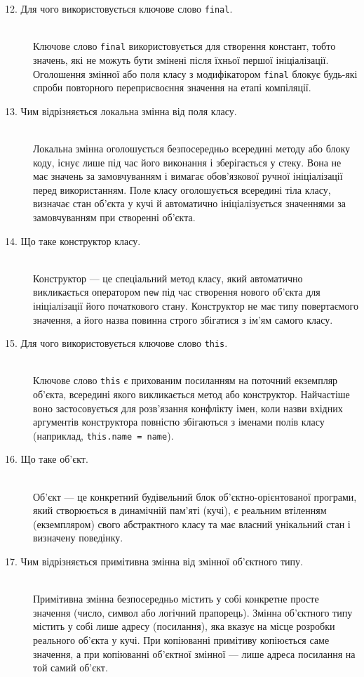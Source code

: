 \begin{description}
    \item[12. Для чого використовується ключове слово \texttt{final}.] ~\\
    Ключове слово \texttt{final} використовується для створення констант, тобто значень, які не можуть бути змінені після їхньої першої ініціалізації. Оголошення змінної або поля класу з модифікатором \texttt{final} блокує будь-які спроби повторного переприсвоєння значення на етапі компіляції.

    \item[13. Чим відрізняється локальна змінна від поля класу.] ~\\
    Локальна змінна оголошується безпосередньо всередині методу або блоку коду, існує лише під час його виконання і зберігається у стеку. Вона не має значень за замовчуванням і вимагає обов'язкової ручної ініціалізації перед використанням. Поле класу оголошується всередині тіла класу, визначає стан об'єкта у кучі й автоматично ініціалізується значеннями за замовчуванням при створенні об'єкта.

    \item[14. Що таке конструктор класу.] ~\\
    Конструктор — це спеціальний метод класу, який автоматично викликається оператором \texttt{new} під час створення нового об'єкта для ініціалізації його початкового стану. Конструктор не має типу повертаємого значення, а його назва повинна строго збігатися з ім'ям самого класу.

    \item[15. Для чого використовується ключове слово \texttt{this}.] ~\\
    Ключове слово \texttt{this} є прихованим посиланням на поточний екземпляр об'єкта, всередині якого викликається метод або конструктор. Найчастіше воно застосовується для розв'язання конфлікту імен, коли назви вхідних аргументів конструктора повністю збігаються з іменами полів класу (наприклад, \texttt{this.name = name}).

    \item[16. Що таке об'єкт.] ~\\
    Об'єкт — це конкретний будівельний блок об'єктно-орієнтованої програми, який створюється в динамічній пам'яті (кучі), є реальним втіленням (екземпляром) свого абстрактного класу та має власний унікальний стан і визначену поведінку.

    \item[17. Чим відрізняється примітивна змінна від змінної об'єктного типу.] ~\\
    Примітивна змінна безпосередньо містить у собі конкретне просте значення (число, символ або логічний прапорець). Змінна об'єктного типу містить у собі лише адресу (посилання), яка вказує на місце розробки реального об'єкта у кучі. При копіюванні примітиву копіюється саме значення, а при копіюванні об'єктної змінної — лише адреса посилання на той самий об'єкт.


\end{description}
